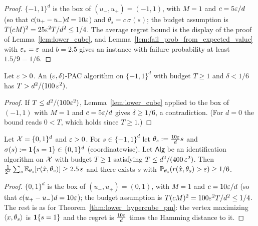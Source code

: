 \begin{proof}
$\{-1,1\}^d$ is the box of $(u_-,u_+) = (-1,1)$, with $M = 1$ and
$c = 5\varepsilon/d$ (so that $c(u_+-u_-)d = 10\varepsilon$) and $\theta_s = c\,\sigma(s)$; the budget
assumption is $T(cM)^2 = 25\varepsilon^2T/d^2 \le 1/4$. The average regret bound is the display of the
proof of Lemma~\ref{lem:lower_cube}, and Lemma~\ref{lem:fail_prob_from_expected_value} with
$\varepsilon_* = \varepsilon$ and $b = 2.5$ gives an instance with failure probability at least
$1.5/9 = 1/6$.
\end{proof}

\begin{corollary}\label{cor:lower_hypercube_pm_pac}
\leanok
{}
Let $\varepsilon > 0$. An $(\varepsilon,\delta)$-PAC algorithm on $\{-1,1\}^d$ with budget $T \ge 1$ and
$\delta < 1/6$ has $T > d^2/(100\,\varepsilon^2)$.
\end{corollary}
\begin{proof}
\leanok
{}
If $T \le d^2/(100\varepsilon^2)$, Lemma~\ref{lem:lower_cube} applied to the box of $(-1,1)$ with
$M = 1$ and $c = 5\varepsilon/d$ gives $\delta \ge 1/6$, a contradiction. (For $d = 0$ the bound reads
$0 < T$, which holds since $T \ge 1$.)
\end{proof}

\begin{theorem}\label{thm:lower_hypercube_01}
Let $\mathcal{X} = \{0,1\}^d$ and $\varepsilon > 0$. For $s \in \{-1,1\}^d$ let $\theta_s := \frac{10\varepsilon}{d}s$
and $\sigma(s) := \mathbf{1}\{s = 1\} \in \{0,1\}^d$ (coordinatewise). Let $\mathsf{Alg}$ be an
identification algorithm on $\mathcal{X}$ with budget $T \ge 1$ satisfying $T \le d^2/(400\,\varepsilon^2)$. Then
$\frac{1}{2^d}\sum_s\mathbb{E}_{\theta_s}[r(\hat{x},\theta_s)] \ge 2.5\,\varepsilon$ and there exists $s$ with
$\mathbb{P}_{\theta_s}(r(\hat{x},\theta_s) > \varepsilon) \ge 1/6$.
\end{theorem}

\begin{proof}
$\{0,1\}^d$ is the box of $(u_-,u_+) = (0,1)$, with $M = 1$ and $c = 10\varepsilon/d$ (so that
$c(u_+-u_-)d = 10\varepsilon$); the budget assumption is $T(cM)^2 = 100\varepsilon^2T/d^2 \le 1/4$. The rest
is as for Theorem~\ref{thm:lower_hypercube_pm}: the vertex maximizing $\langle x, \theta_s \rangle$ is
$\mathbf{1}\{s = 1\}$ and the regret is $\frac{10\varepsilon}{d}$ times the Hamming distance to it.
\end{proof}


